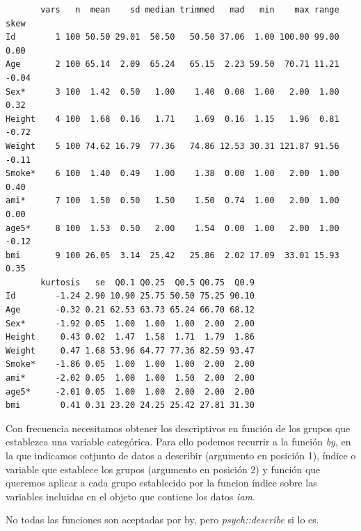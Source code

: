 \documentclass[
  letterpaper,
  DIV=11,
  numbers=noendperiod]{scrreprt}
\newenvironment{Shaded}{\begin{snugshade}}{\end{snugshade}}
\newcommand{\FunctionTok}[1]{\textcolor[rgb]{0.28,0.35,0.67}{#1}}
\newcommand{\NormalTok}[1]{\textcolor[rgb]{0.00,0.23,0.31}{#1}}
\newcommand{\SpecialCharTok}[1]{\textcolor[rgb]{0.37,0.37,0.37}{#1}}
\begin{document}
\begin{verbatim}
       vars   n  mean    sd median trimmed   mad   min    max range  skew
Id        1 100 50.50 29.01  50.50   50.50 37.06  1.00 100.00 99.00  0.00
Age       2 100 65.14  2.09  65.24   65.15  2.23 59.50  70.71 11.21 -0.04
Sex*      3 100  1.42  0.50   1.00    1.40  0.00  1.00   2.00  1.00  0.32
Height    4 100  1.68  0.16   1.71    1.69  0.16  1.15   1.96  0.81 -0.72
Weight    5 100 74.62 16.79  77.36   74.86 12.53 30.31 121.87 91.56 -0.11
Smoke*    6 100  1.40  0.49   1.00    1.38  0.00  1.00   2.00  1.00  0.40
ami*      7 100  1.50  0.50   1.50    1.50  0.74  1.00   2.00  1.00  0.00
age5*     8 100  1.53  0.50   2.00    1.54  0.00  1.00   2.00  1.00 -0.12
bmi       9 100 26.05  3.14  25.42   25.86  2.02 17.09  33.01 15.93  0.35
       kurtosis   se  Q0.1 Q0.25  Q0.5 Q0.75  Q0.9
Id        -1.24 2.90 10.90 25.75 50.50 75.25 90.10
Age       -0.32 0.21 62.53 63.73 65.24 66.70 68.12
Sex*      -1.92 0.05  1.00  1.00  1.00  2.00  2.00
Height     0.43 0.02  1.47  1.58  1.71  1.79  1.86
Weight     0.47 1.68 53.96 64.77 77.36 82.59 93.47
Smoke*    -1.86 0.05  1.00  1.00  1.00  2.00  2.00
ami*      -2.02 0.05  1.00  1.00  1.50  2.00  2.00
age5*     -2.01 0.05  1.00  1.00  2.00  2.00  2.00
bmi        0.41 0.31 23.20 24.25 25.42 27.81 31.30
\end{verbatim}

Con frecuencia necesitamos obtener los descriptivos en función de los
grupos que establezca una variable categórica. Para ello podemos
recurrir a la función \emph{by}, en la que indicamos cotjunto de datos a
describir (argumento en posición 1), índice o variable que establece los
grupos (argumento en posición 2) y función que queremos aplicar a cada
grupo establecido por la funcion índice sobre las variables incluidas en
el objeto que contiene los datos \emph{iam}.

No todas las funciones son aceptadas por by, pero \emph{psych::describe}
si lo es.

\begin{Shaded}
\end{Shaded}
\end{document}
